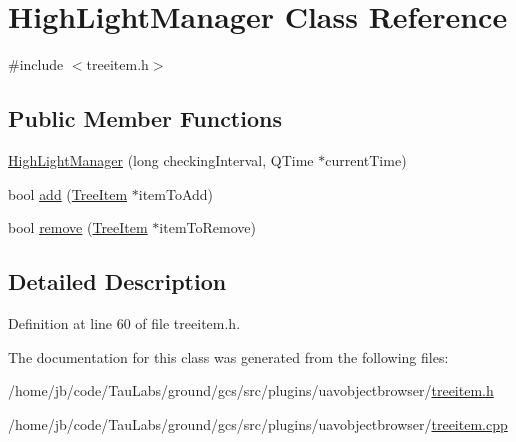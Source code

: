 \hypertarget{class_high_light_manager}{\section{\-High\-Light\-Manager \-Class \-Reference}
\label{class_high_light_manager}
}


{\ttfamily \#include $<$treeitem.\-h$>$}

\subsection*{\-Public \-Member \-Functions}
\begin{DoxyCompactItemize}
\item 
\hyperlink{group___u_a_v_object_browser_plugin_ga3e918ce06821d7300b56319253da49cb}{\-High\-Light\-Manager} (long checking\-Interval, \-Q\-Time $\ast$current\-Time)
\item 
bool \hyperlink{group___u_a_v_object_browser_plugin_ga61c9f35430a5668bcab80f6840ea0f93}{add} (\hyperlink{class_tree_item}{\-Tree\-Item} $\ast$item\-To\-Add)
\item 
bool \hyperlink{group___u_a_v_object_browser_plugin_gac8c19321b7e84ad6ba7a857cf48b21a8}{remove} (\hyperlink{class_tree_item}{\-Tree\-Item} $\ast$item\-To\-Remove)
\end{DoxyCompactItemize}


\subsection{\-Detailed \-Description}


\-Definition at line 60 of file treeitem.\-h.



\-The documentation for this class was generated from the following files\-:\begin{DoxyCompactItemize}
\item 
/home/jb/code/\-Tau\-Labs/ground/gcs/src/plugins/uavobjectbrowser/\hyperlink{treeitem_8h}{treeitem.\-h}\item 
/home/jb/code/\-Tau\-Labs/ground/gcs/src/plugins/uavobjectbrowser/\hyperlink{treeitem_8cpp}{treeitem.\-cpp}\end{DoxyCompactItemize}
